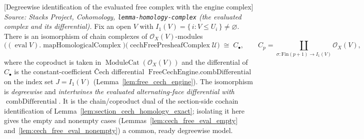 \begin{lemma}

[Degreewise identification of the evaluated free complex with the engine complex]
  \label{lem:cech_free_eval_engine_iso}
  \textit{Source: Stacks Project, Cohomology, \texttt{lemma-homology-complex}
  (the evaluated complex and its differential).}
  Fix an open \(V\) with \(I_1(V) = \{\, i : V \leq U_i \,\} \neq \varnothing\). There
  is an isomorphism of chain complexes of \(\mathcal{O}_X(V)\)-modules
  \[
    \bigl((\operatorname{eval} V).\operatorname{mapHomologicalComplex}\bigr)
      \bigl(\operatorname{cechFreePresheafComplex} \mathcal{U}\bigr)
    \;\cong\;
    C_\bullet,
    \qquad
    C_p = \coprod_{\sigma : \mathrm{Fin}(p+1) \to I_1(V)} \mathcal{O}_X(V),
  \]
  where the coproduct is taken in \(\operatorname{ModuleCat}(\mathcal{O}_X(V))\) and the
  differential of \(C_\bullet\) is the constant-coefficient {\v C}ech differential
  \(\operatorname{FreeCechEngine.combDifferential}\) on the index set \(J = I_1(V)\)
  (Lemma~\ref{lem:free_cech_engine}). The isomorphism is \emph{degreewise} and
  \emph{intertwines the evaluated alternating-face differential with}
  \(\operatorname{combDifferential}\). It is the chain/coproduct dual of the section-side
  cochain identification of Lemma~\ref{lem:section_cech_homology_exact}; isolating it
  here gives the empty and nonempty cases (Lemmas~\ref{lem:cech_free_eval_empty}
  and~\ref{lem:cech_free_eval_nonempty}) a common, ready degreewise model.


\end{lemma}
